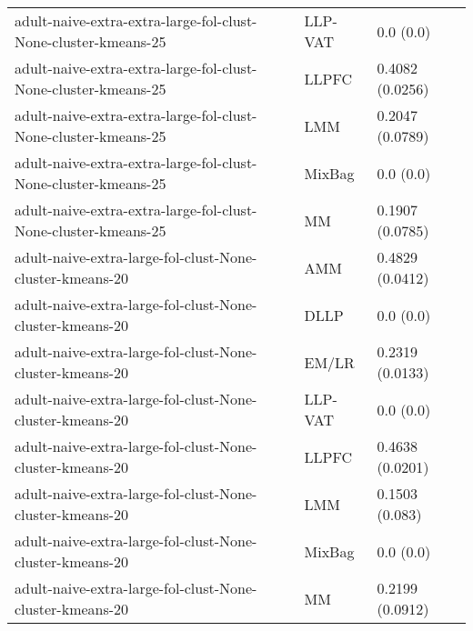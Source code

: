 \begin{longtable}{lll}
                                               adult-naive-extra-extra-large-fol-clust-None-cluster-kmeans-25 &   LLP-VAT &                                 0.0 (0.0) \\
                                               adult-naive-extra-extra-large-fol-clust-None-cluster-kmeans-25 &     LLPFC &                           0.4082 (0.0256) \\
                                               adult-naive-extra-extra-large-fol-clust-None-cluster-kmeans-25 &       LMM &                           0.2047 (0.0789) \\
                                               adult-naive-extra-extra-large-fol-clust-None-cluster-kmeans-25 &    MixBag &                                 0.0 (0.0) \\
                                               adult-naive-extra-extra-large-fol-clust-None-cluster-kmeans-25 &        MM &                           0.1907 (0.0785) \\
                                                     adult-naive-extra-large-fol-clust-None-cluster-kmeans-20 &       AMM &                           0.4829 (0.0412) \\
                                                     adult-naive-extra-large-fol-clust-None-cluster-kmeans-20 &      DLLP &                                 0.0 (0.0) \\
                                                     adult-naive-extra-large-fol-clust-None-cluster-kmeans-20 &     EM/LR &                           0.2319 (0.0133) \\
                                                     adult-naive-extra-large-fol-clust-None-cluster-kmeans-20 &   LLP-VAT &                                 0.0 (0.0) \\
                                                     adult-naive-extra-large-fol-clust-None-cluster-kmeans-20 &     LLPFC &                           0.4638 (0.0201) \\
                                                     adult-naive-extra-large-fol-clust-None-cluster-kmeans-20 &       LMM &                            0.1503 (0.083) \\
                                                     adult-naive-extra-large-fol-clust-None-cluster-kmeans-20 &    MixBag &                                 0.0 (0.0) \\
                                                     adult-naive-extra-large-fol-clust-None-cluster-kmeans-20 &        MM &                           0.2199 (0.0912) \\

\end{longtable}
